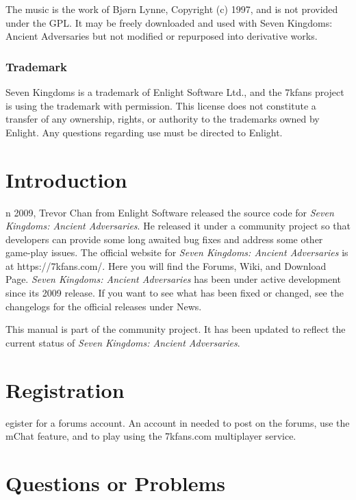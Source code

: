 \documentclass[openany]{book}
\begin{document}
The music is the work of Bjørn Lynne, Copyright (c) 1997, and is not provided under the GPL. It may be freely downloaded and used with Seven Kingdoms: Ancient Adversaries but not modified or repurposed into derivative works.

\subsubsection{Trademark}

Seven Kingdoms is a trademark of Enlight Software Ltd., and the 7kfans project is using the trademark with permission. This license does not constitute a transfer of any ownership, rights, or authority to the trademarks owned by Enlight. Any questions regarding use must be directed to Enlight.

\clearpage

\section{Introduction}

n 2009, Trevor Chan from Enlight Software released the source code for \textit{Seven Kingdoms: Ancient Adversaries}. He released it under a community project so that developers can provide some long awaited bug fixes and address some other game-play issues. The official website for \textit{Seven Kingdoms: Ancient Adversaries} is at https://7kfans.com/. Here you will find the Forums, Wiki, and Download Page. \textit{Seven Kingdoms: Ancient Adversaries} has been under active development since its 2009 release. If you want to see what has been fixed or changed, see the changelogs for the official releases under News. 

This manual is part of the community project. It has been updated to reflect the current status of \textit{Seven Kingdoms: Ancient Adversaries}.

\section{Registration}

egister for a forums account. An account in needed to post on the forums, use the mChat feature, and to play using the 7kfans.com multiplayer service.

\section{Questions or Problems}
\end{document}
